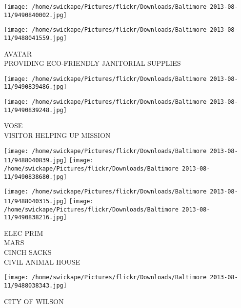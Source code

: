 \documentclass[10pt,letterpaper]{article}
\begin{document}
\texttt{[image: /home/swickape/Pictures/flickr/Downloads/Baltimore 2013-08-11/9490840002.jpg]}

\vspace{0.25in}
\texttt{[image: /home/swickape/Pictures/flickr/Downloads/Baltimore 2013-08-11/9488041559.jpg]}

AVATAR\\
PROVIDING ECO{-}FRIENDLY JANITORIAL SUPPLIES
\pagebreak

\texttt{[image: /home/swickape/Pictures/flickr/Downloads/Baltimore 2013-08-11/9490839486.jpg]}

\vspace{0.25in}
\texttt{[image: /home/swickape/Pictures/flickr/Downloads/Baltimore 2013-08-11/9490839248.jpg]}

VOSE\\
VISITOR HELPING UP MISSION
\pagebreak

\texttt{[image: /home/swickape/Pictures/flickr/Downloads/Baltimore 2013-08-11/9488040839.jpg]}
\texttt{[image: /home/swickape/Pictures/flickr/Downloads/Baltimore 2013-08-11/9490838680.jpg]}

\texttt{[image: /home/swickape/Pictures/flickr/Downloads/Baltimore 2013-08-11/9488040315.jpg]}
\texttt{[image: /home/swickape/Pictures/flickr/Downloads/Baltimore 2013-08-11/9490838216.jpg]}

ELEC PRIM\\
MARS\\
CINCH SACKS\\
CIVIL ANIMAL HOUSE
\pagebreak

\texttt{[image: /home/swickape/Pictures/flickr/Downloads/Baltimore 2013-08-11/9488038343.jpg]}

CITY OF WILSON
\pagebreak
\end{document}
